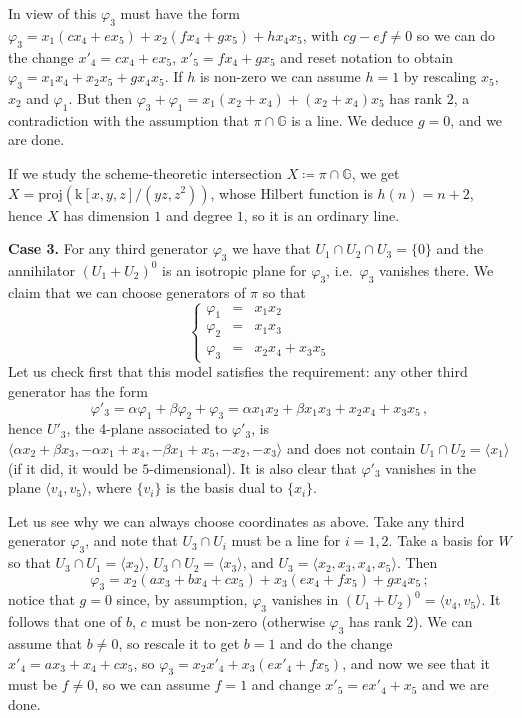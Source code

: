 \documentclass[10pt,reqno]{amsart}
\newcommand{\la}{\langle}
\newcommand{\ra}{\rangle}
\newcommand{\GG}{\mathbb{G}}
\renewcommand{\a}{\alpha}
\renewcommand{\b}{\beta}
\newcommand{\f}{\varphi}
\newcommand{\kk}{\mathrm{k}}
\theoremstyle{definition}
\begin{document}
\noindent In view of this $\f_3$ must have the form $\f_3=x_1(cx_4+ex_5) + x_2(fx_4+gx_5) + hx_4x_5$, with $cg-ef \ne 0$ so we can do the change $x'_4=cx_4+ex_5$, $x'_5=fx_4+gx_5$ and reset notation to obtain $\f_3=x_1x_4+x_2x_5+gx_4x_5$. If $h$ is non-zero we can assume $h=1$ by rescaling $x_5$, $x_2$ and $\f_1$. But then $\f_3+\f_1=x_1(x_2+x_4)+(x_2+x_4)x_5$ has rank $2$, a contradiction with the assumption that $\pi \cap \GG$ is a line. We deduce $g=0$, and we are done.

\noindent If we study the scheme-theoretic intersection $X\coloneqq \pi \cap \GG$, we get
$X=\mathrm{proj}(\kk[x,y,z]/(yz,z^2))$, whose Hilbert function is $h(n)=n+2$, hence $X$ has dimension $1$ and degree $1$, so it is an ordinary line.

\noindent\textbf{Case 3.} For any third generator $\f_3$ we have that $U_1 \cap U_2 \cap U_3=\{0\}$ and the annihilator $(U_1+U_2)^0$ is an isotropic plane for $\f_3$, i.e.~$\f_3$ vanishes there. We claim that we can choose generators of $\pi$ so that
\[ 
\left\{\begin{array}{ccl}
 \f_1 & = & x_1x_2\\
 \f_2 & = & x_1x_3\\
 \f_3 & = & x_2x_4+x_3x_5
\end{array}\right.
\]
Let us check first that this model satisfies the requirement: any other third generator has the form
\[
\f'_3=\a \f_1+\b \f_2+\f_3=\a x_1x_2+\b x_1x_3+x_2x_4+x_3x_5\,,
\]
hence $U'_3$, the 4-plane associated to $\f'_3$, is $\la \a x_2+\b x_3,-\a x_1+x_4,-\b x_1+x_5,-x_2,-x_3 \ra$ and does not contain $U_1 \cap U_2=\la x_1 \ra$ (if it did, it would be $5$-dimensional). It is also clear that $\f'_3$ vanishes in the plane
$\langle v_4,v_5\rangle$, where $\{v_i\}$ is the basis dual to $\{x_i\}$.

\noindent Let us see why we can always choose coordinates as above. Take any third generator $\f_3$, and note that $U_3 \cap U_i$ must be a line for $i=1,2$. Take a basis for $W$ so that $U_3\cap U_1=\la x_2 \ra$, $U_3 \cap U_2=\la x_3 \ra$, and $U_3=\la x_2,x_3,x_4,x_5 \ra$. Then
\begin{equation} \label{eq:fi3}
\f_3=x_2(ax_3+bx_4+cx_5)+x_3(ex_4+fx_5)+gx_4x_5\,;
\end{equation}
notice that $g=0$ since, by assumption, $\f_3$ vanishes in $(U_1+U_2)^0=\la v_4,v_5 \ra$. It follows that one of $b$, $c$ must be non-zero (otherwise $\f_3$ has rank $2$). We can assume that $b \ne 0$, so rescale it to get $b=1$ and do the change $x'_4=ax_3+x_4+cx_5$, so $\f_3=x_2x'_4+x_3(ex'_4+fx_5)$, and now we see that it must be $f \ne 0$, so we can assume $f=1$ and change $x'_5=ex'_4+x_5$ and we are done.
\end{document}
